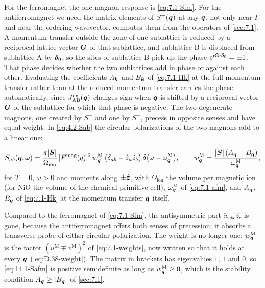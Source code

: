 For the ferromagnet the one-magnon response is \cref{eq:7.1-Sfm}. For the antiferromagnet we need the matrix elements of $S^\pm(\bm{q})$ at any $\bm{q}$, not only near $\Gamma$ and near the ordering wavevector.  computes them from the operators of \cref{sec:7.1}. A momentum transfer outside the zone of one sublattice is reduced by a reciprocal-lattice vector $\bm{G}$ of that sublattice, and sublattice B is displaced from sublattice A by $\bm{\delta}_0$, so the sites of sublattice B pick up the phase $\mathrm{e}^{\mathrm{i}\bm{G}\cdot\bm{\delta}_0} = \pm1$. That phase decides whether the two sublattices add in phase or against each other. Evaluating the coefficients $A_{\bm{k}}$ and $B_{\bm{k}}$ of \cref{eq:7.1-Hk} at the full momentum transfer rather than at the reduced momentum transfer carries the phase automatically, since $J^{\mathrm{ex}}_{\mathrm{AB}}(\bm{q})$ changes sign when $\bm{q}$ is shifted by a reciprocal vector $\bm{G}$ of the sublattice for which that phase is negative. The two degenerate magnons, one created by $S^-$ and one by $S^+$, precess in opposite senses and have equal weight. In \cref{eq:4.2-Sab} the circular polarizations of the two magnons add to a linear one:
\begin{keyresult}
\begin{equation}
  S_{ab}(\bm{q},\omega) = \frac{\pi|\bm{S}|}{\Omega_{\mathrm{ion}}}\,|F^{\mathrm{mag}}(q)|^2\,w^{\mathrm{M}}_{\bm{q}}\,\bigl(\delta_{ab} - \hat z_a\hat z_b\bigr)\,\delta\bigl(\omega - \omega^{\mathrm{M}}_{\bm{q}}\bigr), \qquad
  w^{\mathrm{M}}_{\bm{q}} = \frac{|\bm{S}|\,(A_{\bm{q}} - B_{\bm{q}})}{\omega^{\mathrm{M}}_{\bm{q}}} ,
  \label{eq:14.1-Safm}
\end{equation}
for $T = 0$, $\omega > 0$ and moments along $\pm\hat{\bm{z}}$, with $\Omega_{\mathrm{ion}}$ the volume per magnetic ion (for NiO the volume of the chemical primitive cell), $\omega^{\mathrm{M}}_{\bm{q}}$ of \cref{eq:7.1-afm}, and $A_{\bm{q}}$, $B_{\bm{q}}$ of \cref{eq:7.1-Hk} at the momentum transfer $\bm{q}$ itself.
\end{keyresult}
\noindent Compared to the ferromagnet of \cref{eq:7.1-Sfm}, the antisymmetric part $\ii\epsilon_{abc}\hat z_c$ is gone, because the antiferromagnet offers both senses of precession; it absorbs a transverse probe of either circular polarization. The weight is no longer one: $w^{\mathrm{M}}_{\bm{q}}$ is the factor $(u^{\mathrm{M}} \mp v^{\mathrm{M}})^2$ of \cref{eq:7.1-weights}, now written so that it holds at every $\bm{q}$ (\cref{eq:D.38-weight}). The matrix in brackets has eigenvalues $1$, $1$ and $0$, so \cref{eq:14.1-Safm} is positive semidefinite as long as $w^{\mathrm{M}}_{\bm{q}} \ge 0$, which is the stability condition $A_{\bm{q}} \ge |B_{\bm{q}}|$ of \cref{sec:7.1}.

